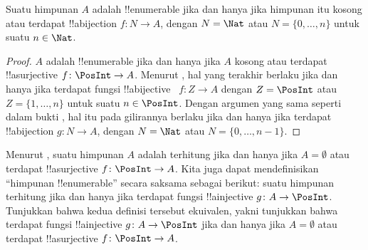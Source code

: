 \documentclass[../../../include/open-logic-section]{subfiles}
\begin{document}
\begin{cor}
Suatu himpunan $A$ adalah !!{enumerable} jika dan hanya jika himpunan itu kosong atau
terdapat !!a{bijection} $f\colon N \to A$, dengan $N = \Nat$ atau $N = \{0,
\dots, n\}$ untuk suatu $n \in \Nat$.
\end{cor}

\begin{proof}
$A$ adalah !!{enumerable} jika dan hanya jika $A$ kosong atau terdapat
!!a{surjective} $f\colon \PosInt \to A$. Menurut , hal
yang terakhir berlaku jika dan hanya jika terdapat fungsi !!a{bijective}
~$f\colon Z \to A$ dengan $Z = \PosInt$ atau $Z = \{1, \dots, n\}$ untuk suatu
$n \in \PosInt$. Dengan argumen yang sama seperti dalam bukti
, hal itu pada gilirannya berlaku jika dan hanya jika
terdapat !!a{bijection} $g\colon N \to A$, dengan $N = \Nat$ atau $N = \{0,
\dots, n-1\}$.
\end{proof}

\begin{prob}
  Menurut , suatu himpunan $A$ adalah
  terhitung jika dan hanya jika $A = \emptyset$ atau terdapat !!a{surjective}
  $f\colon \PosInt \to A$. Kita juga dapat mendefinisikan ``himpunan
  !!{enumerable}'' secara saksama sebagai berikut: suatu himpunan terhitung
  jika dan hanya jika terdapat fungsi !!a{injective} $g\colon A \to \PosInt$.
  Tunjukkan bahwa kedua definisi tersebut ekuivalen, yakni tunjukkan bahwa
  terdapat fungsi !!a{injective} $g\colon A \to \PosInt$ jika dan hanya jika
  $A = \emptyset$ atau terdapat !!a{surjective} $f\colon \PosInt \to A$.
\end{prob}
\end{document}
